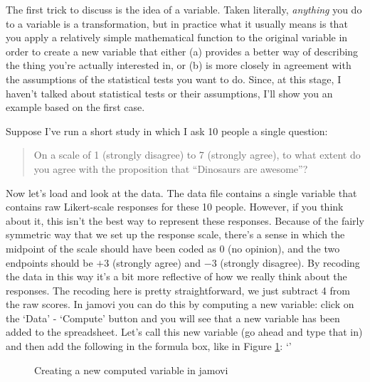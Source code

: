 
The first trick to discuss is the idea of  a variable. Taken literally, {\it anything} you do to a variable is a transformation, but in practice what it usually means is that you apply a relatively simple mathematical function to the original variable in order to create a new variable that either (a) provides a better way of describing the thing you're actually interested in, or (b) is more closely in agreement with the assumptions of the statistical tests you want to do.  Since, at this stage, I haven't talked about statistical tests or their assumptions, I'll show you an example based on the first case. 

Suppose I've run a short study in which I ask 10 people a single question: 
\begin{quote}
On a scale of 1 (strongly disagree) to 7 (strongly agree), to what extent do you agree with the proposition that ``Dinosaurs are awesome''?
\end{quote}
Now let's load and look at the data. The data file  contains a single variable that contains raw Likert-scale responses for these 10 people. However, if you think about it, this isn't the best way to represent these responses. Because of the fairly symmetric way that we set up the response scale, there's a sense in which the midpoint of the scale should have been coded as 0 (no opinion), and the two endpoints should be $+3$ (strongly agree) and $-3$ (strongly disagree). By recoding the data in this way it's a bit more reflective of how we really think about the responses. The recoding here is pretty straightforward, we just subtract 4 from the raw scores. In jamovi you can do this by computing a new variable: click on the `Data' - `Compute' button and you will see that a new variable has been added to the spreadsheet. Let's call this new variable  (go ahead and type that in) and then add the following in the formula box, like in Figure \ref{fig:likertraw}: `' 

\vspace{0.5cm}
\begin{figure}[htb]
\begin{center}
\caption{Creating a new computed variable in jamovi}
\label{fig:likertraw}
\HR
\end{center}
\end{figure}

